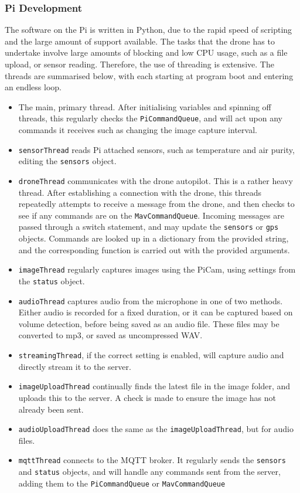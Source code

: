 \documentclass{article}
\begin{document}
\subsubsection{Pi Development}\label{PiDevelopment}
The software on the Pi is written in Python, due to the rapid speed of scripting and the large amount of support available. The tasks that the drone has to undertake involve large amounts of blocking and low CPU usage, such as a file upload, or sensor reading. Therefore, the use of threading is extensive. The threads are summarised below, with each starting at program boot and entering an endless loop. 
\begin{itemize}
	\item The main, primary thread. After initialising variables and spinning off threads, this regularly checks the \texttt{PiCommandQueue}, and will act upon any commands it receives such as changing the image capture interval.
	\item \texttt{sensorThread} reads Pi attached sensors, such as temperature and air purity, editing the \texttt{sensors} object.
	\item \texttt{droneThread} communicates with the drone autopilot. This is a rather heavy thread. After establishing a connection with the drone, this threads repeatedly attempts to receive a message from the drone, and then checks to see if any commands are on the \texttt{MavCommandQueue}. Incoming messages are passed through a switch statement, and may update the \texttt{sensors} or \texttt{gps} objects. Commands are looked up in a dictionary from the provided string, and the corresponding function is carried out with the provided arguments. 
	\item \texttt{imageThread} regularly captures images using the PiCam, using settings from the \texttt{status} object.
	\item \texttt{audioThread} captures audio from the microphone in one of two methods. Either audio is recorded for a fixed duration, or it can be captured based on volume detection, before being saved as an audio file. These files may be converted to mp3, or saved as uncompressed WAV.
	\item \texttt{streamingThread}, if the correct setting is enabled, will capture audio and directly stream it to the server.
	\item \texttt{imageUploadThread} continually finds the latest file in the image folder, and uploads this to the server. A check is made to ensure the image has not already been sent.
	\item \texttt{audioUploadThread} does the same as the \texttt{imageUploadThread}, but for audio files.
	\item \texttt{mqttThread} connects to the MQTT broker. It regularly sends the \texttt{sensors} and \texttt{status} objects, and will handle any commands sent from the server, adding them to the \texttt{PiCommandQueue} or \texttt{MavCommandQueue}
\end{itemize}
\end{document}
